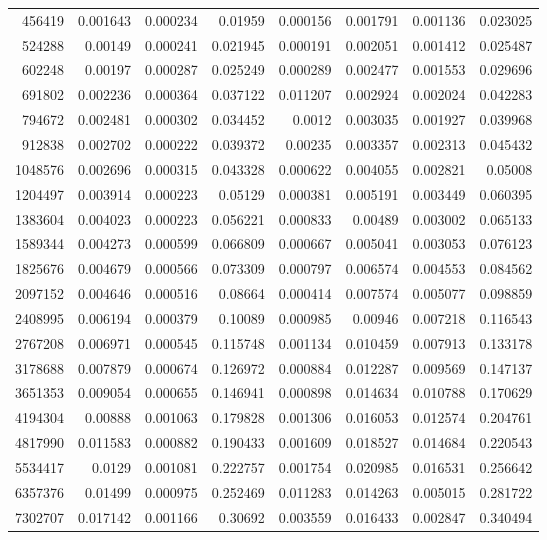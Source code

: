 \begin{longtable}{r r r r r r r r}
456419 & 0.001643 & 0.000234 & 0.01959 & 0.000156 & 0.001791 & 0.001136 & 0.023025 \\
524288 & 0.00149 & 0.000241 & 0.021945 & 0.000191 & 0.002051 & 0.001412 & 0.025487 \\
602248 & 0.00197 & 0.000287 & 0.025249 & 0.000289 & 0.002477 & 0.001553 & 0.029696 \\
691802 & 0.002236 & 0.000364 & 0.037122 & 0.011207 & 0.002924 & 0.002024 & 0.042283 \\
794672 & 0.002481 & 0.000302 & 0.034452 & 0.0012 & 0.003035 & 0.001927 & 0.039968 \\
912838 & 0.002702 & 0.000222 & 0.039372 & 0.00235 & 0.003357 & 0.002313 & 0.045432 \\
1048576 & 0.002696 & 0.000315 & 0.043328 & 0.000622 & 0.004055 & 0.002821 & 0.05008 \\
1204497 & 0.003914 & 0.000223 & 0.05129 & 0.000381 & 0.005191 & 0.003449 & 0.060395 \\
1383604 & 0.004023 & 0.000223 & 0.056221 & 0.000833 & 0.00489 & 0.003002 & 0.065133 \\
1589344 & 0.004273 & 0.000599 & 0.066809 & 0.000667 & 0.005041 & 0.003053 & 0.076123 \\
1825676 & 0.004679 & 0.000566 & 0.073309 & 0.000797 & 0.006574 & 0.004553 & 0.084562 \\
2097152 & 0.004646 & 0.000516 & 0.08664 & 0.000414 & 0.007574 & 0.005077 & 0.098859 \\
2408995 & 0.006194 & 0.000379 & 0.10089 & 0.000985 & 0.00946 & 0.007218 & 0.116543 \\
2767208 & 0.006971 & 0.000545 & 0.115748 & 0.001134 & 0.010459 & 0.007913 & 0.133178 \\
3178688 & 0.007879 & 0.000674 & 0.126972 & 0.000884 & 0.012287 & 0.009569 & 0.147137 \\
3651353 & 0.009054 & 0.000655 & 0.146941 & 0.000898 & 0.014634 & 0.010788 & 0.170629 \\
4194304 & 0.00888 & 0.001063 & 0.179828 & 0.001306 & 0.016053 & 0.012574 & 0.204761 \\
4817990 & 0.011583 & 0.000882 & 0.190433 & 0.001609 & 0.018527 & 0.014684 & 0.220543 \\
5534417 & 0.0129 & 0.001081 & 0.222757 & 0.001754 & 0.020985 & 0.016531 & 0.256642 \\
6357376 & 0.01499 & 0.000975 & 0.252469 & 0.011283 & 0.014263 & 0.005015 & 0.281722 \\
7302707 & 0.017142 & 0.001166 & 0.30692 & 0.003559 & 0.016433 & 0.002847 & 0.340494 \\

\end{longtable}
